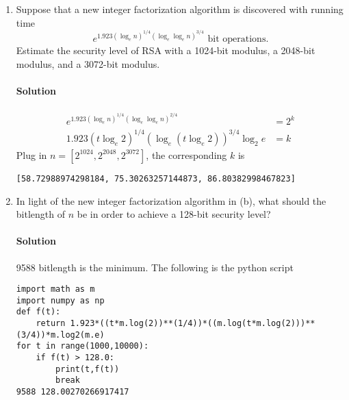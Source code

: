 \documentclass[11pt]{article}
\begin{document}
\begin{enumerate}
\begin{enumerate}
\paragraph{Solution}
Once one knows the factorization of the modulus, the RSAP can be solved in polynomial time by Extended Euclideam Algorithm to find the private key given public key. Since the Factorization algorithm runs in sub-exponential, the runtime of EEA is polynomial and thus negligible. We only need to find the runtime of factorization of the modulus.
\begin{align*}
e^{1.923 (\log_e n)^{1/3} (\log_e \log_e n)^{2/3}} &= 2^k\\
1.923 (t\log_e 2)^{1/3} (\log_e (t\log_e 2))^{2/3} \log_2e &= k
\end{align*}
Plug in $n=[2^{1024},2^{2048},2^{3072}]$, the corresponding $k$ is \begin{verbatim}
[86.76614510070223, 116.88384811926787, 138.73632218673086]
\end{verbatim}

\item Suppose that a new integer factorization algorithm is
discovered with running time
\[
e^{1.923 (\log_e n)^{1/4} (\log_e \log_e n)^{3/4}}
\mbox{ bit operations}.
\]
Estimate the security level of RSA with a 1024-bit modulus, a 2048-bit
modulus, and a 3072-bit modulus.
\paragraph{Solution}
\begin{align*}
e^{1.923 (\log_e n)^{1/4} (\log_e \log_e n)^{2/4}} &= 2^k\\
1.923 (t\log_e 2)^{1/4} (\log_e (t\log_e 2))^{3/4} \log_2e &= k
\end{align*}
Plug in $n=[2^{1024},2^{2048},2^{3072}]$, the corresponding $k$ is
\begin{verbatim}
[58.72988974298184, 75.30263257144873, 86.80382998467823]
\end{verbatim}
\item In light of the new integer factorization algorithm in (b), what
should the bitlength of $n$ be in order to achieve a 128-bit security
level?
\paragraph{Solution}
9588 bitlength is the minimum. The following is the python script
\begin{verbatim}
import math as m
import numpy as np
def f(t):
    return 1.923*((t*m.log(2))**(1/4))*((m.log(t*m.log(2)))**(3/4))*m.log2(m.e)
for t in range(1000,10000):
    if f(t) > 128.0:
        print(t,f(t))
        break
9588 128.00270266917417
\end{verbatim}
\newpage



\end{enumerate}
\end{enumerate}
\end{document}

